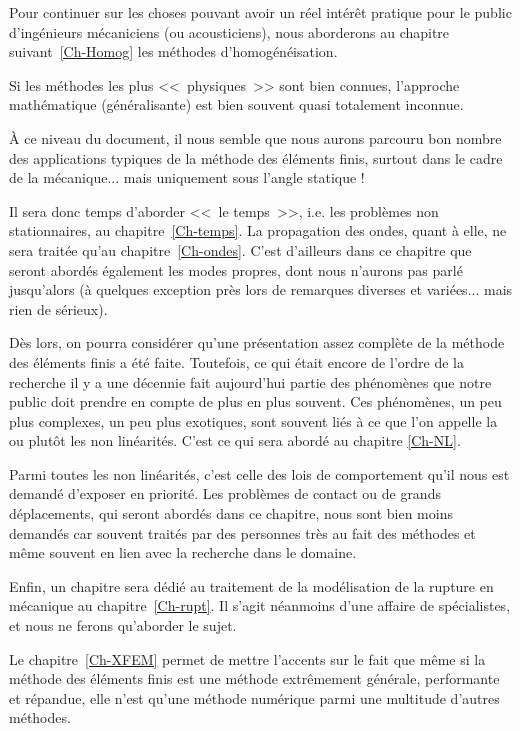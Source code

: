 \medskip
Pour continuer sur les choses pouvant avoir un réel intérêt pratique pour le public d'ingénieurs
mécaniciens (ou acousticiens), nous aborderons au chapitre suivant~\ref{Ch-Homog} les
méthodes d'homogénéisation.

Si les méthodes les plus <<~physiques~>> sont bien connues,
l'approche mathématique (généralisante) est bien souvent quasi totalement inconnue.

\medskip
À ce niveau du document, il nous semble que nous aurons parcouru bon nombre des applications
typiques de la méthode des éléments finis, surtout dans le cadre de la mécanique... mais uniquement sous l'angle
statique !

Il sera donc temps d'aborder <<~le temps~>>, i.e. les problèmes non stationnaires, au
chapitre~\ref{Ch-temps}.
La propagation des ondes, quant à elle, ne sera traitée qu'au chapitre~\ref{Ch-ondes}.
C'est d'ailleurs dans ce chapitre que seront abordés également les modes propres, dont
nous n'aurons pas parlé jusqu'alors (à quelques exception près lors de remarques diverses
et variées... mais rien de sérieux).

\medskip
Dès lors, on pourra considérer qu'une présentation assez complète de la méthode des éléments finis a été faite.
Toutefois, ce qui était encore de l'ordre de la recherche il y a une décennie fait aujourd'hui
partie des phénomènes que notre public doit prendre en compte de plus en plus souvent.
Ces phénomènes, un peu plus complexes, un peu plus exotiques, sont souvent liés à
ce que l'on appelle la ou plutôt les non linéarités. C'est ce qui sera abordé au chapitre
\ref{Ch-NL}.

Parmi toutes les non linéarités, c'est celle des lois de comportement qu'il nous est demandé
d'exposer en priorité. Les problèmes de contact ou de grands déplacements, qui seront
abordés dans ce chapitre, nous sont bien moins demandés car souvent traités par des
personnes très au fait des méthodes et même souvent en lien avec la recherche dans
le domaine.

\medskip
Enfin, un chapitre sera dédié au traitement de la modélisation de la rupture en mécanique
au chapitre~\ref{Ch-rupt}.
Il s'agit néanmoins d'une affaire de spécialistes, et nous ne ferons qu'aborder le sujet.

\medskip
Le chapitre~\ref{Ch-XFEM} permet de mettre l'accents sur le fait que même si la méthode des éléments finis
est une méthode extrêmement générale, performante et répandue, elle n'est qu'une
méthode numérique parmi une multitude d'autres méthodes.

